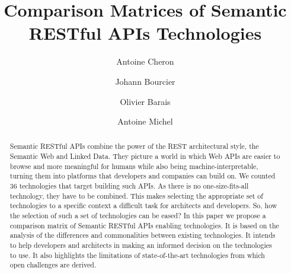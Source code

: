 \documentclass[runningheads]{llncs}
\begin{document}
%
\title{Comparison Matrices of Semantic RESTful APIs Technologies}
%
%
\author{Antoine Cheron \and
Johann Bourcier \and
Olivier Barais \and
Antoine Michel}
%
%
%
\maketitle              %

\begin{abstract}
	
	\vspace*{-0.5cm}
	
Semantic RESTful APIs combine the power of the REST architectural style, the Semantic Web and Linked Data. They picture a world in which Web APIs are easier to browse and more meaningful for humans while also being machine-interpretable, turning them into platforms that developers and companies can build on. We counted 36 technologies that target building such APIs. As there is no one-size-fits-all technology, they have to be combined. This makes selecting the appropriate set of technologies to a specific context a difficult task for architects and developers. So, how the selection of such a set of technologies can be eased?
In this paper we propose a comparison matrix of Semantic RESTful APIs enabling technologies. It is based on the analysis of the differences and commonalities between existing technologies. It intends to help developers and architects in making an informed decision on the technologies to use. It also highlights the limitations of state-of-the-art technologies from which open challenges are derived.

\vspace*{-0.2cm}
\end{abstract}
%







%
%
%
% 
% 
%



\end{document}
